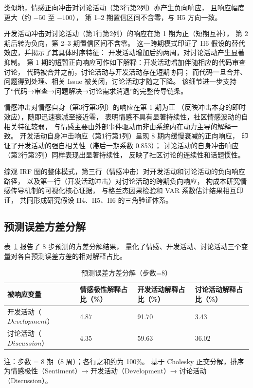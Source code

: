 类似地，情感正向冲击对讨论活动（第3行第2列）亦产生负向响应，
且响应幅度更大（约 $-50$ 至 $-100$），
第 1--2 期置信区间不含零，与 H5 方向一致。

开发活动冲击对讨论活动（第1行第2列）的响应在第 1 期为正（短期互补），
第 2 期后转为负向，第 2--3 期置信区间不含零。
这一跨期模式印证了 H6 假设的替代效应，并揭示了其具体时序特征：
开发活动增加后约两周，对讨论活动产生显著抑制。
第 1 期的短暂正向响应可作如下解释：开发活动增加伴随相应的代码审查讨论，
代码被合并之前，讨论活动与开发活动存在短期协同；
而代码一旦合并、问题得到处理、相关 Issue 被关闭，讨论活动才随之下降。
该细节进一步支持了“代码→审查→问题解决→讨论需求消退”的完整传导链条。

情感冲击对情感自身（第3行第3列）的响应在第 1 期为正
（反映冲击本身的即时效应），随即迅速衰减至接近零，
表明情感不具有显著持续性，社区情感波动的自相关特征较弱，
与情感主要由外部事件驱动而非由系统内在动力主导的解释一致。
开发活动自身冲击响应（第1行第1列）呈现 8 期内缓慢衰减的正向响应，
印证了开发活动的强自相关性（滞后一期系数 0.853）；
讨论活动的自身冲击响应（第2行第2列）同样表现出显著持续性，
反映了社区讨论的连续性和话题惯性。

综观 IRF 图的整体模式，第三行（情感冲击）对开发活动和讨论活动的负向响应路径，
以及第一行（开发活动冲击）对讨论活动的跨期负向响应，
构成本研究情感传导机制的可视化核心证据，
与格兰杰因果检验和 VAR 系数估计结果相互印证，
共同形成研究假设 H4、H5、H6 的三角验证体系。

\subsection{预测误差方差分解}

表~\ref{tab:fevd} 报告了 8 步预测的方差分解结果，
量化了情感、开发活动、讨论活动三个变量对各自预测误差方差的相对解释占比。

\begin{table}[htbp]
    \centering
    \caption{预测误差方差分解（步数=8）}
    \label{tab:fevd}
    \begin{tabularx}{\textwidth}{p{3.5cm}XXX}
        \toprule
        被响应变量 & 情感极性解释占比（\%） & 开发活动解释占比（\%） & 讨论活动解释占比（\%） \\
        \midrule
        开发活动（$Development$）    & 4.87 & 91.70 & 3.43 \\
        讨论活动（$Discussion$） & 4.35 & 59.63 & 36.02 \\
        \bottomrule
    \end{tabularx}
    \begin{minipage}{\textwidth}
        \vspace{0.3em}
        \footnotesize 注：步数 = 8 期（8 周）；各行之和约为 100\%。
              基于 Cholesky 正交分解，排序为情感极性（Sentiment）→ 开发活动（Development）→ 讨论活动（Discussion）。
    \end{minipage}
\end{table}

